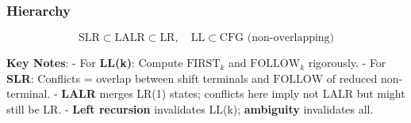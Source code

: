 \subsubsection*{Hierarchy}
\[
\text{SLR} \subset \text{LALR} \subset \text{LR}, \quad \text{LL} \subset \text{CFG (non-overlapping)}
\]


\textbf{Key Notes}:
- For \textbf{LL(k)}: Compute \(\text{FIRST}_k\) and \(\text{FOLLOW}_k\) rigorously.
- For \textbf{SLR}: Conflicts = overlap between shift terminals and \(\text{FOLLOW}\) of reduced non-terminal.
- \textbf{LALR} merges LR(1) states; conflicts here imply not LALR but might still be LR.
- \textbf{Left recursion} invalidates LL(k); \textbf{ambiguity} invalidates all.
